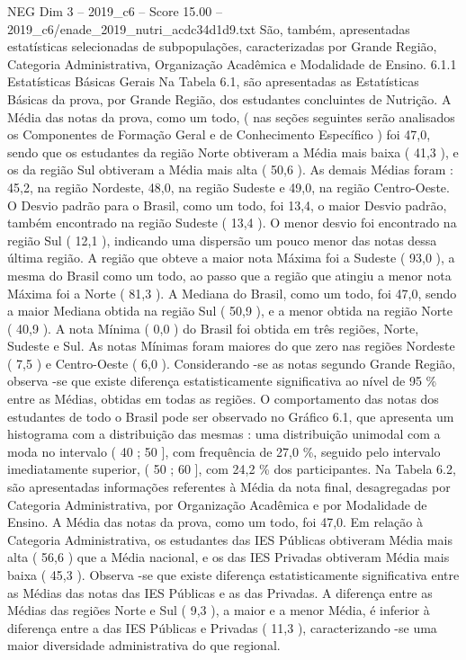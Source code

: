\begin{textsample}{NEG Dim 3 – 2019\_c6 – Score 15.00 – 2019\_c6/enade\_2019\_nutri\_acdc34d1d9.txt}
São, também, apresentadas estatísticas selecionadas de subpopulações, caracterizadas por Grande Região, Categoria Administrativa, Organização Acadêmica e Modalidade de Ensino. 6.1.1 Estatísticas Básicas Gerais Na Tabela 6.1, são apresentadas as Estatísticas Básicas da prova, por Grande Região, dos estudantes concluintes de Nutrição.
A Média das notas da prova, como um todo, ( nas seções seguintes serão analisados os Componentes de Formação Geral e de Conhecimento Específico ) foi 47,0, sendo que os estudantes da região Norte obtiveram a Média mais baixa ( 41,3 ), e os da região Sul obtiveram a Média mais alta ( 50,6 ).
As demais Médias foram : 45,2, na região Nordeste, 48,0, na região Sudeste e 49,0, na região Centro-Oeste.
O Desvio padrão para o Brasil, como um todo, foi 13,4, o maior Desvio padrão, também encontrado na região Sudeste ( 13,4 ).
O menor desvio foi encontrado na região Sul ( 12,1 ), indicando uma dispersão um pouco menor das notas dessa última região.
A região que obteve a maior nota Máxima foi a Sudeste ( 93,0 ), a mesma do Brasil como um todo, ao passo que a região que atingiu a menor nota Máxima foi a Norte ( 81,3 ).
A Mediana do Brasil, como um todo, foi 47,0, sendo a maior Mediana obtida na região Sul ( 50,9 ), e a menor obtida na região Norte ( 40,9 ).
A nota Mínima ( 0,0 ) do Brasil foi obtida em três regiões, Norte, Sudeste e Sul.
As notas Mínimas foram maiores do que zero nas regiões Nordeste ( 7,5 ) e Centro-Oeste ( 6,0 ).
Considerando -se as notas segundo Grande Região, observa -se que existe diferença estatisticamente significativa ao nível de 95 \% entre as Médias, obtidas em todas as regiões.
O comportamento das notas dos estudantes de todo o Brasil pode ser observado no Gráfico 6.1, que apresenta um histograma com a distribuição das mesmas : uma distribuição unimodal com a moda no intervalo ( 40 ; 50 ], com frequência de 27,0 \%, seguido pelo intervalo imediatamente superior, ( 50 ; 60 ], com 24,2 \% dos participantes.
Na Tabela 6.2, são apresentadas informações referentes à Média da nota final, desagregadas por Categoria Administrativa, por Organização Acadêmica e por Modalidade de Ensino.
A Média das notas da prova, como um todo, foi 47,0.
Em relação à Categoria Administrativa, os estudantes das IES Públicas obtiveram Média mais alta ( 56,6 ) que a Média nacional, e os das IES Privadas obtiveram Média mais baixa ( 45,3 ).
Observa -se que existe diferença estatisticamente significativa entre as Médias das notas das IES Públicas e as das Privadas.
A diferença entre as Médias das regiões Norte e Sul ( 9,3 ), a maior e a menor Média, é inferior à diferença entre a das IES Públicas e Privadas ( 11,3 ), caracterizando -se uma maior diversidade administrativa do que regional.

\end{textsample}
